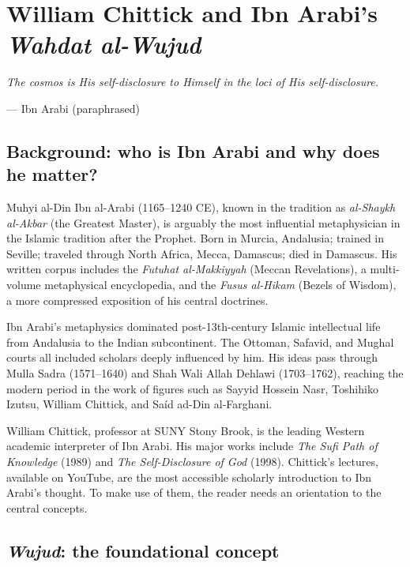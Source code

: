 \documentclass[11pt,a4paper]{book}
\theoremstyle{cleanrm}
\begin{document}
\chapter{William Chittick and Ibn Arabi's \emph{Wahdat al-Wujud}}

\epigraph{\itshape The cosmos is His self-disclosure to Himself in
the loci of His self-disclosure.}{--- Ibn Arabi (paraphrased)}

\section{Background: who is Ibn Arabi and why does he matter?}

Muhyi al-Din Ibn al-Arabi (1165--1240 CE), known in the tradition as
\emph{al-Shaykh al-Akbar} (the Greatest Master), is arguably the most
influential metaphysician in the Islamic tradition after the Prophet.
Born in Murcia, Andalusia; trained in Seville; traveled through North
Africa, Mecca, Damascus; died in Damascus. His written corpus
includes the \emph{Futuhat al-Makkiyyah} (Meccan Revelations), a
multi-volume metaphysical encyclopedia, and the \emph{Fusus al-Hikam}
(Bezels of Wisdom), a more compressed exposition of his central
doctrines.

Ibn Arabi's metaphysics dominated post-13th-century Islamic
intellectual life from Andalusia to the Indian subcontinent. The
Ottoman, Safavid, and Mughal courts all included scholars deeply
influenced by him. His ideas pass through Mulla Sadra (1571--1640) and
Shah Wali Allah Dehlawi (1703--1762), reaching the modern period in
the work of figures such as Sayyid Hossein Nasr, Toshihiko Izutsu,
William Chittick, and Sa\'id ad-Din al-Farghani.

William Chittick, professor at SUNY Stony Brook, is the leading
Western academic interpreter of Ibn Arabi. His major works include
\emph{The Sufi Path of Knowledge} (1989) and \emph{The Self-Disclosure
of God} (1998). Chittick's lectures, available on YouTube, are the
most accessible scholarly introduction to Ibn Arabi's thought. To
make use of them, the reader needs an orientation to the central
concepts.

\section{\emph{Wujud}: the foundational concept}
\end{document}
